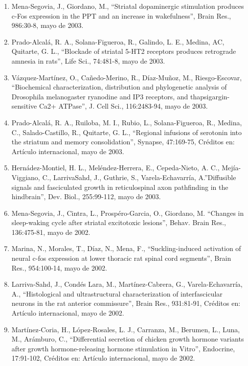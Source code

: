 \begin{enumerate}
\item Mena-Segovia, J., Giordano, M., “Striatal dopaminergic stimulation produces c-Fos expression in the PPT and an increase 
in wakefulness”, Brain Res., 986:30-8,    mayo de 2003.

\item Prado-Alcalá, R. A., Solana-Figueroa, R., Galindo, L. E., Medina, AC, Quitarte, G. L., “Blockade of striatal 5-HT2 
receptors produces retrograde amnesia in rats”, Life Sci., 74:481-8,    mayo de 2003.

\item Vázquez-Martínez, O., Cañedo-Merino, R., Díaz-Muñoz, M., Riesgo-Escovar, “Biochemical characterization, distribution 
and 
phylogenetic analysis of Drosophila melanogaster ryanodine and IP3 receptors, and thapsigargin-sensitive Ca2+ ATPase”, J. 
Cell Sci., 116:2483-94,    mayo de 2003.

\item Prado-Alcalá, R. A., Ruiloba, M. I., Rubio, L., Solana-Figueroa, R., Medina, C., Salado-Castillo, R., Quitarte, G. L., 
“Regional infusions of serotonin into the striatum and memory consolidation”, Synapse, 47:169-75, Créditos en: Artículo 
internacional, mayo de 2003.

\item Hernádez-Montiel, H. L., Meléndez-Herrera, E., Cepeda-Nieto, A. C., Mejía-Viggiano, C., LarrivaSahd, J., Guthrie, S., 
Varela-Echavarría, A.”Diffusible signals and fasciculated growth in reticulospinal
axon pathfinding in the hindbrain”, Dev. Biol., 255:99-112,    mayo de 2003.

\item Mena-Segovia, J., Cintra, L., Prospéro-Garcia, O., Giordano, M. “Changes in sleep-waking cycle after striatal 
excitotoxic 
lesions”, Behav. Brain Res., 136:475-81,    mayo de 2002.

\item Marina, N., Morales, T., Díaz, N., Mena, F., “Suckling-induced activation of neural c-fos expression at lower thoracic 
rat spinal cord segments”, Brain Res., 954:100-14,    mayo de 2002.

\item Larriva-Sahd, J., Condés Lara, M., Martínez-Cabrera, G., Varela-Echavarría, A., “Histological and ultrastructural 
characterization of interfascicular neurons in the rat anterior commissure”, Brain Res., 931:81-91, Créditos en: Artículo 
internacional, mayo de 2002.

\item Martínez-Coria, H., López-Rosales, L. J., Carranza, M., Berumen, L., Luna, M., Arámburo, C., “Differential secretion of 
chicken growth hormone variants after growth hormone-releasing hormone stimulation in Vitro”, Endocrine, 17:91-102, Créditos 
en: Artículo internacional, mayo de 2002.


\end{enumerate}
